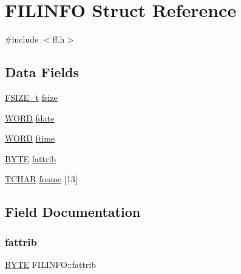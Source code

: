 \hypertarget{struct_f_i_l_i_n_f_o}{}\section{F\+I\+L\+I\+N\+FO Struct Reference}
\label{struct_f_i_l_i_n_f_o}


{\ttfamily \#include $<$ff.\+h$>$}

\subsection*{Data Fields}
\begin{DoxyCompactItemize}
\item 
\mbox{\hyperlink{ff_8h_a3fc0992ad7436250b6b1a0592214b7f2}{F\+S\+I\+Z\+E\+\_\+t}} \mbox{\hyperlink{struct_f_i_l_i_n_f_o_a9e5b78ed7190f73de3ebcbdfbd6d1844}{fsize}}
\item 
\mbox{\hyperlink{integer_8h_a197942eefa7db30960ae396d68339b97}{W\+O\+RD}} \mbox{\hyperlink{struct_f_i_l_i_n_f_o_a7c01c48a15b1b49da459924437b0bd52}{fdate}}
\item 
\mbox{\hyperlink{integer_8h_a197942eefa7db30960ae396d68339b97}{W\+O\+RD}} \mbox{\hyperlink{struct_f_i_l_i_n_f_o_ae0f751b79621bf7b29669f177bbe6b9a}{ftime}}
\item 
\mbox{\hyperlink{lz4_8c_a4ae1dab0fb4b072a66584546209e7d58}{B\+Y\+TE}} \mbox{\hyperlink{struct_f_i_l_i_n_f_o_a838d542585831b085537b363f18205c0}{fattrib}}
\item 
\mbox{\hyperlink{ff_8h_a03bdb8ce5895c7e261aadc2529637546}{T\+C\+H\+AR}} \mbox{\hyperlink{struct_f_i_l_i_n_f_o_abd852510f2f79b4ec773156d8942dc7c}{fname}} \mbox{[}13\mbox{]}
\end{DoxyCompactItemize}


\subsection{Field Documentation}
\mbox{\label{struct_f_i_l_i_n_f_o_a838d542585831b085537b363f18205c0}} 
\subsubsection{\texorpdfstring{fattrib}{fattrib}}
{\footnotesize\ttfamily \mbox{\hyperlink{lz4_8c_a4ae1dab0fb4b072a66584546209e7d58}{B\+Y\+TE}} F\+I\+L\+I\+N\+F\+O\+::fattrib}

